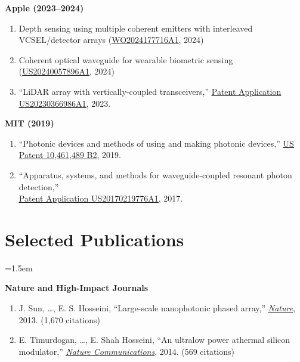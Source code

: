 \noindent\textbf{Apple (2023--2024)}
\begin{enumerate}
    \item Depth sensing using multiple coherent emitters with interleaved VCSEL/detector arrays (\href{https://patents.google.com/patent/WO2024177716A1}{\underline{WO2024177716A1}}, 2024)
    \item Coherent optical waveguide for wearable biometric sensing (\href{https://patents.google.com/patent/US20240057896A1}{\underline{US20240057896A1}}, 2024)
    \item ``LiDAR array with vertically-coupled transceivers,'' \href{https://patents.google.com/patent/US20230366986A1}{\underline{Patent Application US20230366986A1}}, 2023.
\end{enumerate}

\noindent\textbf{MIT (2019)}
\begin{enumerate}
    \item ``Photonic devices and methods of using and making photonic devices,'' \href{https://patents.google.com/patent/US10461489B2}{\underline{US Patent 10,461,489 B2}}, 2019.
    \item ``Apparatus, systems, and methods for waveguide-coupled resonant photon detection,'' \\
    \href{https://patents.google.com/patent/US20170219776A1}{\underline{Patent Application US20170219776A1}}, 2017.
\end{enumerate}
\section{Selected Publications}
\vspace{0.2cm}
\begingroup
{}
\emergencystretch=1.5em

\noindent\textbf{Nature and High-Impact Journals}
\begin{enumerate}
    \item J. Sun, \ldots, E. S. Hosseini, ``Large-scale nanophotonic phased array,'' \href{https://doi.org/10.1038/nature12107}{\underline{\textit{Nature}}}, 2013. (1,670 citations)
    \item E. Timurdogan, \ldots, E. Shah Hosseini, ``An ultralow power athermal silicon modulator,'' \href{https://doi.org/10.1038/ncomms5107}{\underline{\textit{Nature Communications}}}, 2014. (569 citations)
\end{enumerate}


